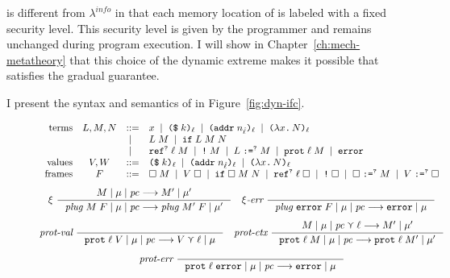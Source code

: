 \DynIFC is different from $\lambda^{\textit{info}}$ in that each memory location
of \DynIFC is labeled with a fixed security level. This security level is given
by the programmer and remains unchanged during program execution. I will show in
Chapter~\ref{ch:mech-metatheory} that this choice of the dynamic extreme makes
it possible that \Surface satisfies the gradual guarantee.

I present the syntax and semantics of \DynIFC in Figure~\ref{fig:dyn-ifc}.


\begin{figure}[tbp]
  \raggedright
  {\small \[
  \begin{array}{rcll}
    \text{terms}  & L , M , N & ::=  & x \;\mid\; \text{\texttt{{(\$}}}\;{k}\text{\texttt{{)}}}_{\ell} \;\mid\; \text{\texttt{{(addr}}}\;{n_{\hat{\ell}}}\text{\texttt{{)}}}_{\ell} \;\mid\; \text{\texttt{{(${\lambda}$}}}{x}\text{\texttt{{.}}}\,{N}\text{\texttt{{)}}}_{\ell} \\
                           &  & \;\mid\; & L \; M \;\mid\; \text{\texttt{{if}}}\;{L}\;{M}\;{N} \\
                           &  & \;\mid\; & \text{\texttt{{ref}}}^{\text{\texttt{{?}}}}\;{\ell}\;{M} \;\mid\; \text{\texttt{{!}}}\;{M} \;\mid\; {L}\;\text{\texttt{{:=}}}^{\text{\texttt{{?}}}}\;{M} \;\mid\; \text{\texttt{{prot}}}\;{\ell}\;{M} \;\mid\; \mathtt{error} \\
    \text{values}     & V, W     & ::=  & \text{\texttt{{(\$}}}\;{k}\text{\texttt{{)}}}_{\ell} \;\mid\; \text{\texttt{{(addr}}}\;{n_{\hat{\ell}}}\text{\texttt{{)}}}_{\ell} \;\mid\; \text{\texttt{{(${\lambda}$}}}{x}\text{\texttt{{.}}}\,{N}\text{\texttt{{)}}}_{\ell} \\
    \text{frames} & F & ::= & \Box\;M \;\mid\; V\;\Box \;\mid\; \text{\texttt{{if}}}\;{\Box}\;{M}\;{N} \;\mid\; \text{\texttt{{ref}}}^{\text{\texttt{{?}}}}\;{\ell}\;{\Box}
                              \;\mid\; \text{\texttt{{!}}}\;{\Box} \;\mid\; {\Box}\;\text{\texttt{{:=}}}^{\text{\texttt{{?}}}}\;{M} \;\mid\; {V}\;\text{\texttt{{:=}}}^{\text{\texttt{{?}}}}\;{\Box}
  \end{array}
  \]}
  {\small
  \begin{gather*}
  \xi~
  \inference
  {\reduce{M}{\mu}{\pc}{M'}{\mu'}}
  {\reduce{\mathit{plug}\;M\;F}{\mu}{\pc}{\mathit{plug}\;M'\;F}{\mu'}}
  \quad
  \xi\textit{-err}~
  \inference{}{\reduce{\mathit{plug}\;\key{error}\;F}{\mu}{\pc}{\key{error}}{\mu}}
  \\[1ex]
  \textit{prot-val}~
  \inference{}{\reduce{\dynprot{\ell}{V}}{\mu}{\pc}{V \curlyvee \ell}{\mu}}
  \quad
  \textit{prot-ctx}~
  \inference
  {\reduce{M}{\mu}{\pc \curlyvee \ell}{M'}{\mu'}}
  {\reduce{\dynprot{\ell}{M}}{\mu}{\pc}{\dynprot{\ell}{M'}}{\mu'}}
  \\[1ex]
  \textit{prot-err}~
  \inference{}{\reduce{\dynprot{\ell}{\key{error}}}{\mu}{\pc}{\key{error}}{\mu}}

\end{gather*}}
\end{figure}
